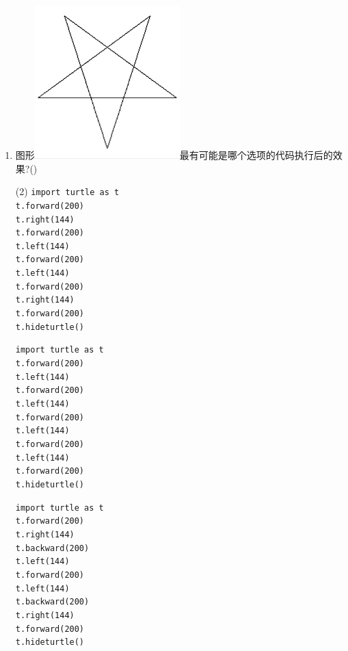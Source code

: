 \documentclass[11pt]{ctexart}
\begin{document}
\begin{enumerate}
        \item 图形\includegraphics[width=.05\textwidth]{11.png}最有可能是哪个选项的代码执行后的效果?(\qquad)
        \begin{tasks}(2)
            \task \lstinline{import turtle as t}\\
            \lstinline{t.forward(200)}\\
            \lstinline{t.right(144)}\\
            \lstinline{t.forward(200)}\\
            \lstinline{t.left(144)}\\
            \lstinline{t.forward(200)}\\
            \lstinline{t.left(144)}\\
            \lstinline{t.forward(200)}\\
            \lstinline{t.right(144)}\\
            \lstinline{t.forward(200)}\\
            \lstinline{t.hideturtle()}

            \task \lstinline{import turtle as t}\\
            \lstinline{t.forward(200)}\\
            \lstinline{t.left(144)}\\
            \lstinline{t.forward(200)}\\
            \lstinline{t.left(144)}\\
            \lstinline{t.forward(200)}\\
            \lstinline{t.left(144)}\\
            \lstinline{t.forward(200)}\\
            \lstinline{t.left(144)}\\
            \lstinline{t.forward(200)}\\
            \lstinline{t.hideturtle()}

            \task \lstinline{import turtle as t}\\
            \lstinline{t.forward(200)}\\
            \lstinline{t.right(144)}\\
            \lstinline{t.backward(200)}\\
            \lstinline{t.left(144)}\\
            \lstinline{t.forward(200)}\\
            \lstinline{t.left(144)}\\
            \lstinline{t.backward(200)}\\
            \lstinline{t.right(144)}\\
            \lstinline{t.forward(200)}\\
            \lstinline{t.hideturtle()}


\end{tasks}
\end{enumerate}
\end{document}
